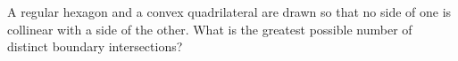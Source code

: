 A regular hexagon and a convex quadrilateral are drawn so that no side of one is collinear with a side of the other. What is the greatest possible number of distinct boundary intersections?
